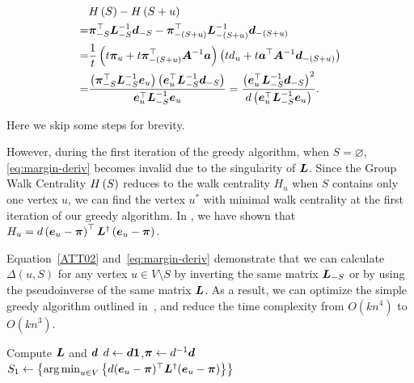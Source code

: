\documentclass[10pt,twocolumn,twoside]{IEEEtran}
\begin{document}
\begin{equation}\label{eq:margin-deriv}
    \begin{split}
        &H\left(S\right)-H\left(S+u\right)\\
        =&\boldsymbol{\pi}_{-S}^\top\boldsymbol{L}_{-S}^{-1}\boldsymbol{d}_{-S}-\boldsymbol{\pi}_{-(S+u)}^\top\boldsymbol{L}_{-(S+u)}^{-1}\boldsymbol{d}_{-(S+u)}\\
        =&\frac1t\left( t\boldsymbol{\pi}_u+t\boldsymbol{\pi}_{-(S+u)}^\top\boldsymbol{A}^{-1}\boldsymbol{a} \right)\left( td_u+t\boldsymbol{a}^\top\boldsymbol{A}^{-1}\boldsymbol{d}_{-(S+u)} \right)\\
        =&\frac{\left( \boldsymbol{\pi}_{-S}^\top\boldsymbol{L}_{-S}^{-1}\boldsymbol{e}_u \right)\left( \boldsymbol{e}_u^\top\boldsymbol{L}_{-S}^{-1}\boldsymbol{d}_{-S} \right)}{\boldsymbol{e}_u^\top\boldsymbol{L}_{-S}^{-1}\boldsymbol{e}_u}=\frac{\left( \boldsymbol{e}_u^\top\boldsymbol{L}_{-S}^{-1}\boldsymbol{d}_{-S} \right)^2}{d\left( \boldsymbol{e}_u^\top\boldsymbol{L}_{-S}^{-1}\boldsymbol{e}_u \right)}.
    \end{split}
\end{equation}

Here we skip some steps for brevity.

However, during the first iteration of the greedy algorithm, when \(S=\varnothing\), \eqref{eq:margin-deriv} becomes invalid due to the singularity of \(\boldsymbol{L}\).
Since the Group Walk Centrality \(H\left(S\right)\) reduces to the walk centrality \(H_u\) when \(S\) contains only one vertex \(u\), we can find the vertex \(u^*\) with minimal walk centrality at the first iteration of our greedy algorithm.
In , we have shown that \(H_u=d\left( \boldsymbol{e}_u-\boldsymbol{\pi} \right)^\top\boldsymbol{L}^{\dagger}\left( \boldsymbol{e}_u-\boldsymbol{\pi} \right)\).

Equation~\eqref{ATT02} and~\eqref{eq:margin-deriv} demonstrate that we can calculate \(\Delta(u,S)\) for any vertex \(u\in V\setminus S\) by inverting the same matrix \(\boldsymbol{L}_{-S}\) or by using the pseudoinverse of the same matrix \(\boldsymbol{L}\).
As a result, we can optimize the simple greedy algorithm outlined in~, and reduce the time complexity from \(O(kn^4)\) to \(O(kn^3)\).

\begin{algorithm}
    \caption{\(\text{Exact}\mathcal{GWCM}\)\((\gr,k)\)}
    \label{algo:exact-gwcm}
    Compute \(\boldsymbol{L}\) and \(\boldsymbol{d}\)\;
    \(d\gets\boldsymbol{d}\boldsymbol{1}\),\(\boldsymbol{\pi}\gets {d}^{-1}\boldsymbol{d}\)\;
    \(S_1\gets\left\{\operatorname*{arg\,min}_{u\in V}\left\{d(\boldsymbol{e}_u-\boldsymbol{\pi})^\top\boldsymbol{L}^\dagger(\boldsymbol{e}_u-\boldsymbol{\pi}) \right\} \right\}\)\;
\end{algorithm}
\end{document}
